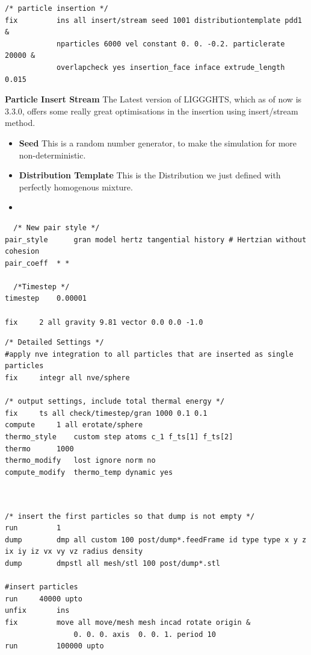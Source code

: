 \documentclass{tufte-book} %
\begin{document}
\begin{verbatim}
/* particle insertion */
fix         ins all insert/stream seed 1001 distributiontemplate pdd1 &
            nparticles 6000 vel constant 0. 0. -0.2. particlerate 20000 &
            overlapcheck yes insertion_face inface extrude_length 0.015                
\end{verbatim}
\textbf{Particle Insert Stream} The Latest version of LIGGGHTS, which as of now is 3.3.0, offers some really great optimisations in the insertion using insert/stream method.
\begin{itemize}
\item \textbf{Seed} This is a random number generator, to make the simulation for more non-deterministic.
\item \textbf{Distribution Template} This is the Distribution we just defined with perfectly homogenous mixture.
\item 
\end{itemize}

\begin{verbatim}
  /* New pair style */
pair_style      gran model hertz tangential history # Hertzian without cohesion
pair_coeff	* *

  /*Timestep */
timestep	0.00001

fix		2 all gravity 9.81 vector 0.0 0.0 -1.0

\end{verbatim}
\begin{verbatim}
/* Detailed Settings */
#apply nve integration to all particles that are inserted as single particles
fix		integr all nve/sphere

/* output settings, include total thermal energy */
fix		ts all check/timestep/gran 1000 0.1 0.1
compute		1 all erotate/sphere
thermo_style	custom step atoms c_1 f_ts[1] f_ts[2]  
thermo		1000
thermo_modify	lost ignore norm no
compute_modify	thermo_temp dynamic yes

  
\end{verbatim}
\begin{verbatim}
/* insert the first particles so that dump is not empty */
run			1
dump		dmp all custom 100 post/dump*.feedFrame id type type x y z ix iy iz vx vy vz radius density  
dump 		dmpstl all mesh/stl 100 post/dump*.stl

#insert particles
run		40000 upto
unfix		ins
fix 		move all move/mesh mesh incad rotate origin &
                0. 0. 0. axis  0. 0. 1. period 10
run 		100000 upto 

\end{verbatim}
\end{document}
